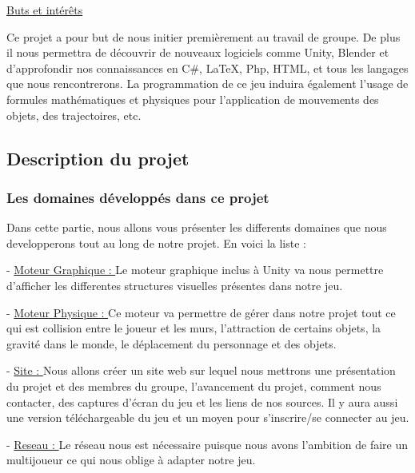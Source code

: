 \documentclass[a4paper , 12pt]{article}
\begin{document}
\quad
 
	\underline{Buts et intérêts}

\quad

    Ce projet a pour but de nous initier premièrement au travail de groupe. De plus il nous permettra de découvrir de nouveaux logiciels comme Unity, Blender et d’approfondir nos connaissances en C\#, LaTeX, Php, HTML, et tous les langages que nous rencontrerons.
La programmation de ce jeu induira également l’usage de formules mathématiques et physiques pour l’application de mouvements des objets, des trajectoires, etc.

\newpage

\subsection{Description du projet}

	\subsubsection{Les domaines développés dans ce projet}
Dans cette partie, nous allons vous présenter les differents domaines que nous developperons tout au long de notre projet. En voici la liste :

\quad

- \underline{Moteur Graphique : } Le moteur graphique inclus à Unity va nous permettre d’afficher les differentes structures visuelles présentes dans notre jeu.

\quad 

- \underline{Moteur Physique : } Ce moteur va permettre de gérer dans notre projet tout ce qui est collision entre le joueur et les murs, l’attraction de certains objets, la gravité dans le monde, le déplacement du personnage et des objets.

\quad

- \underline{Site : } Nous allons créer un site web sur lequel nous mettrons une présentation du projet et des membres du groupe, l’avancement du projet, comment nous contacter, des captures d’écran du jeu et les liens de nos sources. Il y aura aussi une version téléchargeable du jeu et un moyen pour s’inscrire/se connecter au jeu.

\quad

- \underline{Reseau : } Le réseau nous est nécessaire puisque nous avons l’ambition de faire un multijoueur ce qui nous oblige à adapter notre jeu.

\quad
\end{document}
